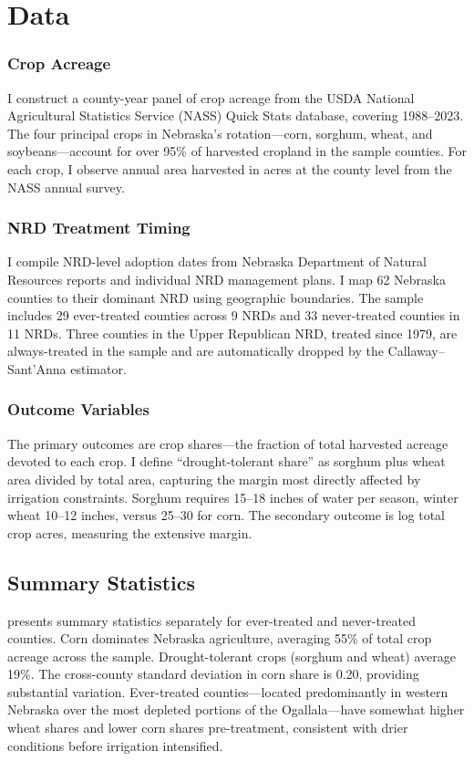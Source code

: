 \documentclass[12pt]{article}
\begin{document}
\section{Data}

\subsubsection*{Crop Acreage} I construct a county-year panel of crop acreage from the USDA National Agricultural Statistics Service (NASS) Quick Stats database, covering 1988--2023. The four principal crops in Nebraska's rotation---corn, sorghum, wheat, and soybeans---account for over 95\% of harvested cropland in the sample counties. For each crop, I observe annual area harvested in acres at the county level from the NASS annual survey.

\subsubsection*{NRD Treatment Timing} I compile NRD-level adoption dates from Nebraska Department of Natural Resources reports and individual NRD management plans. I map 62 Nebraska counties to their dominant NRD using geographic boundaries. The sample includes 29 ever-treated counties across 9 NRDs and 33 never-treated counties in 11 NRDs. Three counties in the Upper Republican NRD, treated since 1979, are always-treated in the sample and are automatically dropped by the Callaway--Sant'Anna estimator.

\subsubsection*{Outcome Variables} The primary outcomes are crop shares---the fraction of total harvested acreage devoted to each crop. I define ``drought-tolerant share'' as sorghum plus wheat area divided by total area, capturing the margin most directly affected by irrigation constraints. Sorghum requires 15--18 inches of water per season, winter wheat 10--12 inches, versus 25--30 for corn. The secondary outcome is log total crop acres, measuring the extensive margin.

\subsection{Summary Statistics}



 presents summary statistics separately for ever-treated and never-treated counties. Corn dominates Nebraska agriculture, averaging 55\% of total crop acreage across the sample. Drought-tolerant crops (sorghum and wheat) average 19\%. The cross-county standard deviation in corn share is 0.20, providing substantial variation. Ever-treated counties---located predominantly in western Nebraska over the most depleted portions of the Ogallala---have somewhat higher wheat shares and lower corn shares pre-treatment, consistent with drier conditions before irrigation intensified.
\end{document}
